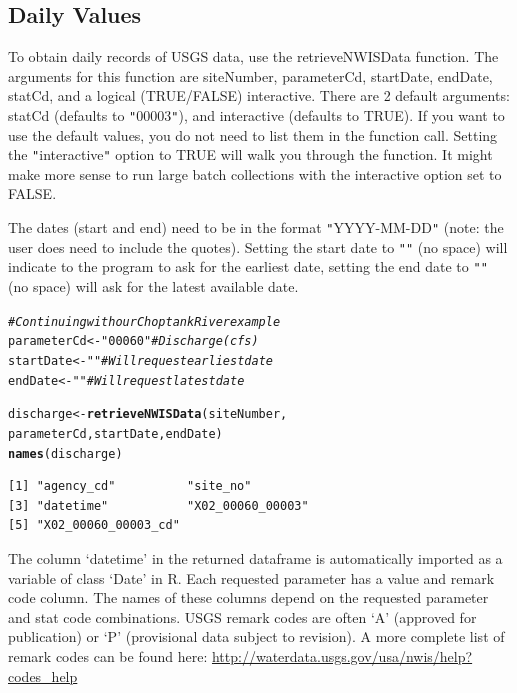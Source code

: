 \documentclass[a4paper,11pt]{article}\usepackage[]{graphicx}\usepackage[]{color}
\makeatletter
\newcommand{\hlstr}[1]{\textcolor[rgb]{0.192,0.494,0.8}{#1}}%
\newcommand{\hlcom}[1]{\textcolor[rgb]{0.678,0.584,0.686}{\textit{#1}}}%
\newcommand{\hlstd}[1]{\textcolor[rgb]{0.345,0.345,0.345}{#1}}%
\newcommand{\hlkwb}[1]{\textcolor[rgb]{0.69,0.353,0.396}{#1}}%
\newcommand{\hlkwd}[1]{\textcolor[rgb]{0.737,0.353,0.396}{\textbf{#1}}}%
\newenvironment{kframe}{%
 \def\at@end@of@kframe{}%
 \ifinner\ifhmode%
  \def\at@end@of@kframe{\end{minipage}}%
  \begin{minipage}{\columnwidth}%
 \fi\fi%
 \def\FrameCommand##1{\hskip\@totalleftmargin \hskip-\fboxsep
 \colorbox{shadecolor}{##1}\hskip-\fboxsep
     \hskip-\linewidth \hskip-\@totalleftmargin \hskip\columnwidth}%
 \MakeFramed {\advance\hsize-\width
   \@totalleftmargin\z@ \linewidth\hsize
   \@setminipage}}%
 {\par\unskip\endMakeFramed%
 \at@end@of@kframe}
\newenvironment{knitrout}{}{} %
\makeatother
\begin{document}
\subsection{Daily Values}
\label{sec:usgsDaily}
To obtain daily records of USGS data, use the retrieveNWISData function. The arguments for this function are siteNumber, parameterCd, startDate, endDate, statCd, and a logical (TRUE/FALSE) interactive. There are 2 default arguments: statCd (defaults to \texttt{"}00003\texttt{"}), and interactive (defaults to TRUE).  If you want to use the default values, you do not need to list them in the function call. Setting the \texttt{"}interactive\texttt{"} option to TRUE will walk you through the function. It might make more sense to run large batch collections with the interactive option set to FALSE. 

The dates (start and end) need to be in the format \texttt{"}YYYY-MM-DD\texttt{"} (note: the user does need to include the quotes).  Setting the start date to \texttt{"}\texttt{"} (no space) will indicate to the program to ask for the earliest date, setting the end date to \texttt{"}\texttt{"} (no space) will ask for the latest available date.

\begin{knitrout}
\color{fgcolor}\begin{kframe}
\begin{alltt}
\hlcom{# Continuing with our Choptank River example}
\hlstd{parameterCd} \hlkwb{<-} \hlstr{"00060"}  \hlcom{# Discharge (cfs)}
\hlstd{startDate} \hlkwb{<-} \hlstr{""}  \hlcom{# Will request earliest date}
\hlstd{endDate} \hlkwb{<-} \hlstr{""} \hlcom{# Will request latest date}

\hlstd{discharge} \hlkwb{<-} \hlkwd{retrieveNWISData}\hlstd{(siteNumber,}
                    \hlstd{parameterCd, startDate, endDate)}
\hlkwd{names}\hlstd{(discharge)}
\end{alltt}
\begin{verbatim}
[1] "agency_cd"          "site_no"           
[3] "datetime"           "X02_00060_00003"   
[5] "X02_00060_00003_cd"
\end{verbatim}
\end{kframe}
\end{knitrout}


The column `datetime' in the returned dataframe is automatically imported as a variable of class `Date' in R. Each requested parameter has a value and remark code column.  The names of these columns depend on the requested parameter and stat code combinations. USGS remark codes are often `A' (approved for publication) or `P' (provisional data subject to revision). A more complete list of remark codes can be found here:
\url{http://waterdata.usgs.gov/usa/nwis/help?codes_help}
\end{document}

